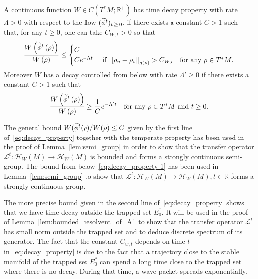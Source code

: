 \documentclass[AHL,Unicode,longabstracts,published]{cedram}
\newcommand{\clH}{\mathcal{H}}
\newcommand{\clL}{\mathcal{L}}
\newcommand{\bbR}{\mathbb{R}}
\let\oldtilde\tilde
\renewcommand*{\tilde}[1]{\mathchoice{\widetilde{#1}}{\widetilde{#1}}{\oldtilde{#1}}{\oldtilde{#1}}}
\newcommand{\clH}{\mathcal{H}}
\newcommand{\bbR}{\mathbb{R}}
\begin{document}
\begin{cBoxA}{}
\begin{defi}\label{def:decay_W}
A continuous function $W\in C(T^{*}M;\bbR^{+})$ has time decay property with rate $\Lambda>0$ with respect to the flow $(\tilde{\phi}^{t})_{t\,\geq\,0}$, if there exists a constant $C>1$ such that, for any $t\geq0$, one can take $C_{W,t}>0$ so that
\begin{equation}\label{eq:decay_property}
\frac{W\left(\tilde{\phi}^{t}\left(\rho\right)\right)}{W\left(\rho\right)}\leq
\begin{cases}
C\\
Ce^{-\Lambda t} & \text{ if }\left\Vert \rho_{u}+\rho_{s}\right\Vert _{g\left(\rho\right)}>C_{W,t}\quad\text{for any \ensuremath{\rho\in T^{*}M}.}
\end{cases}
\end{equation}
Moreover $W$ has a decay controlled from below with rate $\Lambda'\geq0$ if there exists a constant $C>1$ such that
\begin{equation}\label{eq:decay_property-1}
\frac{W\left(\tilde{\phi}^{t}\left(\rho\right)\right)}{W\left(\rho\right)}\geq\frac{1}{C}e^{-\Lambda't} \quad\text{for any \ensuremath{\rho\in T^{*}M}\text{ and }\ensuremath{t\ge0}}.
\end{equation}
\end{defi}
\end{cBoxA}

\begin{rema}
The general bound $W(\tilde{\phi}^{t}(\rho)/W(\rho)\leq C$ given by the first line of~\eqref{eq:decay_property} together with the temperate property has been used in the proof of Lemma~\ref{lem:semi_group} in order to show that the transfer operator $\clL^{t}:\clH _{W}(M)\rightarrow\clH _{W}(M)$ is bounded and forms a strongly continuous semi-group. The bound from below~\eqref{eq:decay_property-1} has been used in Lemma~\ref{lem:semi_group} to show that $\clL^{t}:\clH _{W}(M)\rightarrow\clH _{W}(M),t\in\bbR$ forms a strongly continuous group.

The more precise bound given in the second line of~\eqref{eq:decay_property} shows that we have time decay outside the trapped set $E_{0}^{*}$. It will be used in the proof of Lemma~\ref{lem:bounded_resolvent_of_A'} to show that the transfer operator $\clL^{t}$ has small norm outside the trapped set and to deduce discrete spectrum of its generator. The fact that the constant $C_{w,t}$ depends on time $t$ in~\eqref{eq:decay_property} is due to the fact that a trajectory close to the stable manifold of the trapped set $E_{0}^{*}$ can spend a long time close to the trapped set where there is no decay. During that time, a wave packet spreads exponentially.
\end{rema}
\end{document}
